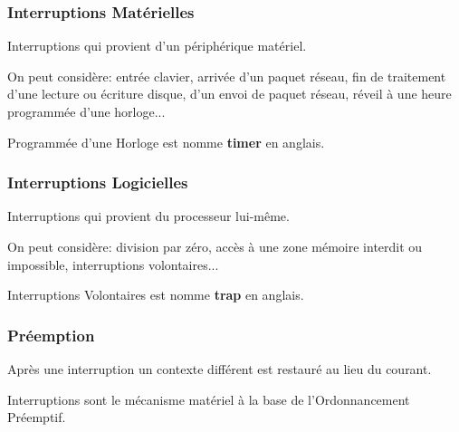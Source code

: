 \documentclass{article}
\begin{document}
\subsubsection{Interruptions Matérielles}
\begin{definition}
    Interruptions qui provient d'un périphérique matériel.

    \begin{example}
        On peut considère: entrée clavier, arrivée d'un paquet réseau, fin de traitement d'une lecture ou écriture disque, d'un envoi de paquet réseau, réveil à une heure programmée d'une horloge...

        \begin{remark}
            Programmée d'une Horloge est nomme \textbf{timer} en anglais.
        \end{remark}
    \end{example}
\end{definition}

\subsubsection{Interruptions Logicielles}
\begin{definition}
    Interruptions qui provient du processeur lui-même.

    \begin{example}
        On peut considère: division par zéro, accès à une zone mémoire interdit ou impossible, interruptions volontaires...

        \begin{remark}
            Interruptions Volontaires est nomme \textbf{trap} en anglais.
        \end{remark}
    \end{example}
\end{definition}

\subsubsection{Préemption}
\begin{definition}
    Après une interruption un contexte différent est restauré au lieu du courant.
    \begin{remark}
        Interruptions sont le mécanisme matériel à la base de l'Ordonnancement Préemptif.
    \end{remark}
\end{definition}
\end{document}
